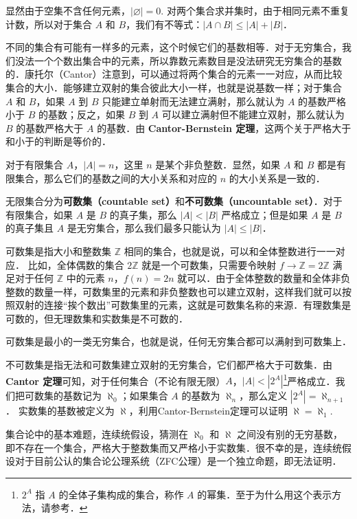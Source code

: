 

显然由于空集不含任何元素，$|\varnothing|=0$. 对两个集合求并集时，由于相同元素不重复计数，所以对于集合 $A$ 和 $B$，我们有不等式：$|A\cap B|\leqslant|A|+|B|$．

不同的集合有可能有一样多的元素，这个时候它们的基数相等．对于无穷集合，我们没法一个个数出集合中的元素，所以靠数元素数目是没法研究无穷集合的基数的．康托尔（Cantor）注意到，可以通过将两个集合的元素一一对应，从而比较集合的大小．能够建立双射的集合彼此大小一样，也就是说基数一样；对于集合 $A$ 和 $B$，如果 $A$ 到 $B$ 只能建立单射而无法建立满射，那么就认为 $A$ 的基数严格小于 $B$ 的基数；反之，如果 $B$ 到 $A$ 可以建立满射但不能建立双射，那么就认为 $B$ 的基数严格大于 $A$ 的基数．由 \textbf{Cantor-Bernstein 定理}，这两个关于严格大于和小于的判断是等价的．

对于有限集合 $A$，$|A|=n$，这里 $n$ 是某个非负整数．显然，如果 $A$ 和 $B$ 都是有限集合，那么它们的基数之间的大小关系和对应的 $n$ 的大小关系是一致的．

无限集合分为\textbf{可数集（countable set）}和\textbf{不可数集（uncountable set）}．对于有限集合，如果 $A$ 是 $B$ 的真子集，那么 $|A|<|B|$ 严格成立；但是如果 $A$ 是 $B$ 的真子集且 $A$ 是无穷集合，那么我们最多只能认为 $|A|\leqslant|B|$．

可数集是指大小和整数集 $\mathbb{Z}$ 相同的集合，也就是说，可以和全体整数进行一一对应． 比如，全体偶数的集合 $2\mathbb{Z}$ 就是一个可数集，只需要令映射 $f\rightarrow \mathbb{Z}=2\mathbb{Z}$ 满足对于任何 $\mathbb{Z}$ 中的元素 $n$，$f(n)=2n$ 就可以．由于全体整数的数量和全体非负整数的数量一样，可数集里的元素和非负整数也可以建立双射，这样我们就可以按照双射的连接“挨个数出”可数集里的元素，这就是可数集名称的来源．有理数集是可数的，但无理数集和实数集是不可数的．

可数集是最小的一类无穷集合，也就是说，任何无穷集合都可以满射到可数集上．

不可数集是指无法和可数集建立双射的无穷集合，它们都严格大于可数集．由 \textbf{Cantor 定理}可知，对于任何集合（不论有限无限）$A$，$|A|<|2^A|$\footnote{$2^A$ 指 $A$ 的全体子集构成的集合，称作 $A$ 的幂集．至于为什么用这个表示方法，请参考．}严格成立．我们把可数集的基数记为 $\aleph_0$；如果集合 $A$ 的基数为 $\aleph_n$，那么定义 $|2^A|=\aleph_{n+1}$． 实数集的基数被定义为 $\aleph$，利用Cantor-Bernstein定理可以证明 $\aleph=\aleph_1$. 

集合论中的基本难题，连续统假设，猜测在 $\aleph_0$ 和 $\aleph$ 之间没有别的无穷基数，即不存在一个集合，严格大于整数集而又严格小于实数集．很不幸的是，连续统假设对于目前公认的集合论公理系统（ZFC公理）是一个独立命题，即无法证明．

